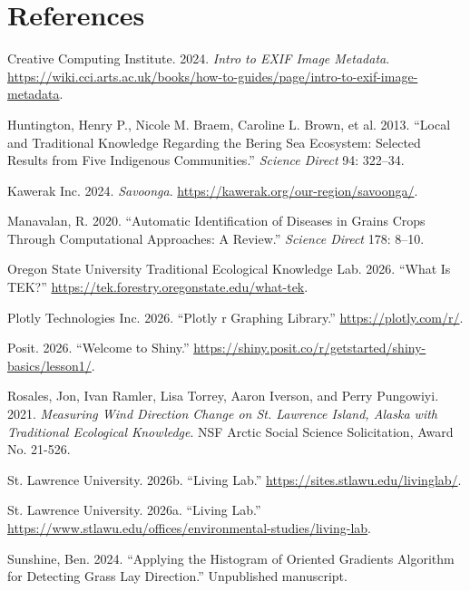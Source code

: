 \documentclass[
]{article}
\newlength{\cslhangindent}
\newenvironment{CSLReferences}[2] %
 {\begin{list}{}{%
  \setlength{\itemindent}{0pt}
  \setlength{\leftmargin}{0pt}
  \setlength{\parsep}{0pt}
  \ifodd #1
   \setlength{\leftmargin}{\cslhangindent}
   \setlength{\itemindent}{-1\cslhangindent}
  \fi
  \setlength{\itemsep}{#2\baselineskip}}}
 {\end{list}}
\begin{document}
\clearpage

\section*{References}\label{references}

\protect{}\label{refs}
\begin{CSLReferences}{1}{1}
Creative Computing Institute. 2024. \emph{Intro to EXIF Image Metadata}.
\url{https://wiki.cci.arts.ac.uk/books/how-to-guides/page/intro-to-exif-image-metadata}.

Huntington, Henry P., Nicole M. Braem, Caroline L. Brown, et al. 2013.
{``Local and Traditional Knowledge Regarding the Bering Sea Ecosystem:
Selected Results from Five Indigenous Communities.''} \emph{Science
Direct} 94: 322--34.

Kawerak Inc. 2024. \emph{Savoonga}.
\url{https://kawerak.org/our-region/savoonga/}.

Manavalan, R. 2020. {``Automatic Identification of Diseases in Grains
Crops Through Computational Approaches: A Review.''} \emph{Science
Direct} 178: 8--10.

Oregon State University Traditional Ecological Knowledge Lab. 2026.
{``What Is TEK?''} \url{https://tek.forestry.oregonstate.edu/what-tek}.

Plotly Technologies Inc. 2026. {``Plotly r Graphing Library.''}
\url{https://plotly.com/r/}.

Posit. 2026. {``Welcome to Shiny.''}
\url{https://shiny.posit.co/r/getstarted/shiny-basics/lesson1/}.

Rosales, Jon, Ivan Ramler, Lisa Torrey, Aaron Iverson, and Perry
Pungowiyi. 2021. \emph{Measuring Wind Direction Change on {St. Lawrence
Island, Alaska} with Traditional Ecological Knowledge}. NSF Arctic
Social Science Solicitation, Award No. 21-526.

St. Lawrence University. 2026b. {``Living Lab.''}
\url{https://sites.stlawu.edu/livinglab/}.

St. Lawrence University. 2026a. {``Living Lab.''}
\url{https://www.stlawu.edu/offices/environmental-studies/living-lab}.

Sunshine, Ben. 2024. {``Applying the Histogram of Oriented Gradients
Algorithm for Detecting Grass Lay Direction.''} Unpublished manuscript.

\end{CSLReferences}
\end{document}
